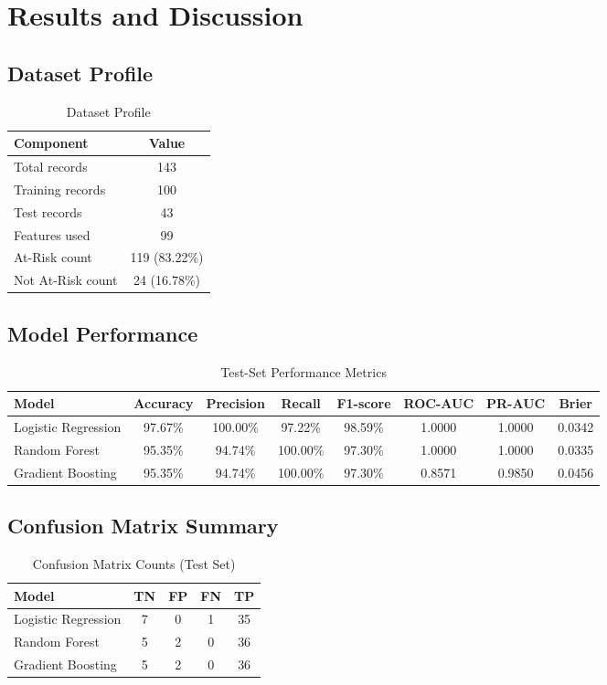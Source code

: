 \documentclass[conference]{IEEEtran}
\begin{document}
\section{Results and Discussion}
\subsection{Dataset Profile}
\begin{table}[htbp]
\caption{Dataset Profile}
\centering
\begin{tabular}{lc}
\toprule
Component & Value \\
\midrule
Total records & 143 \\
Training records & 100 \\
Test records & 43 \\
Features used & 99 \\
At-Risk count & 119 (83.22\%) \\
Not At-Risk count & 24 (16.78\%) \\
\bottomrule
\end{tabular}
\end{table}

\subsection{Model Performance}
\begin{table}[htbp]
\caption{Test-Set Performance Metrics}
\centering
\begin{tabular}{lccccccc}
\toprule
Model & Accuracy & Precision & Recall & F1-score & ROC-AUC & PR-AUC & Brier \\
\midrule
Logistic Regression & 97.67\% & 100.00\% & 97.22\% & 98.59\% & 1.0000 & 1.0000 & 0.0342 \\
Random Forest & 95.35\% & 94.74\% & 100.00\% & 97.30\% & 1.0000 & 1.0000 & 0.0335 \\
Gradient Boosting & 95.35\% & 94.74\% & 100.00\% & 97.30\% & 0.8571 & 0.9850 & 0.0456 \\
\bottomrule
\end{tabular}
\end{table}

\subsection{Confusion Matrix Summary}
\begin{table}[htbp]
\caption{Confusion Matrix Counts (Test Set)}
\centering
\begin{tabular}{lcccc}
\toprule
Model & TN & FP & FN & TP \\
\midrule
Logistic Regression & 7 & 0 & 1 & 35 \\
Random Forest & 5 & 2 & 0 & 36 \\
Gradient Boosting & 5 & 2 & 0 & 36 \\
\bottomrule
\end{tabular}
\end{table}
\end{document}
